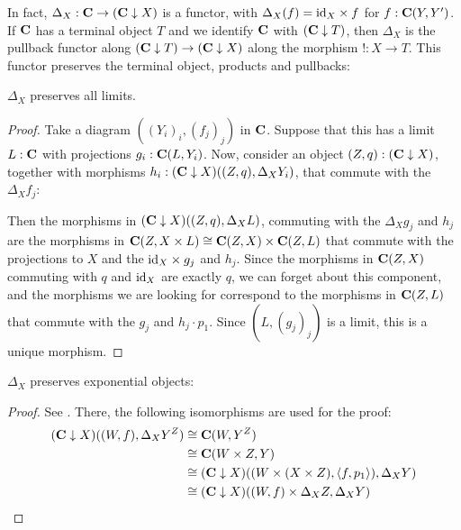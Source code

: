 In fact, $ \Delta_X : \mathbf{C} \to (\mathbf{C} \downarrow X) $ is a functor, with $ \Delta_X(f) = \text{id}_{X} \times f $ for $ f: \mathbf{C}(Y, Y^\prime) $. If $ \mathbf{C} $ has a terminal object $ T $ and we identify $ \mathbf{C} $ with $ (\mathbf{C} \downarrow T) $, then $ \Delta_X $ is the pullback functor along $ (\mathbf{C} \downarrow T) \to (\mathbf{C} \downarrow X) $ along the morphism $ !: X \to T $. This functor preserves the terminal object, products and pullbacks:
\begin{lemma}\label{lem:delta-limits}
  $ \Delta_X $ preserves all limits.
\end{lemma}
\begin{proof}
  Take a diagram $ ((Y_i)_i, (f_j)_j) $ in $ \mathbf{C} $. Suppose that this has a limit $ L : \mathbf{C} $ with projections $ g_i : \mathbf{C}(L, Y_i) $. Now, consider an object $ (Z, q) : (\mathbf{C} \downarrow X) $, together with morphisms $ h_i : (\mathbf{C} \downarrow X)((Z, q), \Delta_X Y_i) $, that commute with the $ \Delta_X f_j $:
  \begin{center}
  \end{center}
  Then the morphisms in $ (\mathbf{C} \downarrow X)((Z, q), \Delta_X L) $, commuting with the $ \Delta_X g_j $ and $ h_j $ are the morphisms in $ \mathbf{C}(Z, X \times L) \cong \mathbf{C}(Z, X) \times \mathbf{C}(Z, L) $ that commute with the projections to $ X $ and the $ \text{id}_{X} \times g_j $ and $ h_j $. Since the morphisms in $ \mathbf{C}(Z, X) $ commuting with $ q $ and $ \text{id}_{X} $ are exactly $ q $, we can forget about this component, and the morphisms we are looking for correspond to the morphisms in $ \mathbf{C}(Z, L) $ that commute with the $ g_j $ and $ h_j \cdot p_1 $. Since $ (L, (g_j)_j) $ is a limit, this is a unique morphism.
\end{proof}

\begin{lemma}\label{lem:delta-exponentials}
  $ \Delta_X $ preserves exponential objects:
\end{lemma}
\begin{proof}
  See \autocite[][Volume 3, Lemma 5.8.2]{borceux}. There, the following isomorphisms are used for the proof:
  \begin{align*}
    (\mathbf{C} \downarrow X)((W, f), \Delta_X Y^Z) &\cong \mathbf{C}(W, Y^Z)\\
    &\cong \mathbf{C}(W \times Z, Y)\\
    &\cong (\mathbf{C} \downarrow X)((W \times (X \times Z), \langle f, p_1 \rangle), \Delta_X Y)\\
    &\cong (\mathbf{C} \downarrow X)((W, f) \times \Delta_X Z, \Delta_X Y)\\
  \end{align*}
\end{proof}

